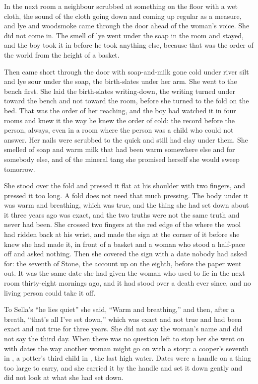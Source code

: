In the next room a neighbour scrubbed at something on the floor with a wet cloth, the sound of the cloth going down and coming up regular as a measure, and lye and woodsmoke came through the door ahead of the woman's voice. She did not come in. The smell of lye went under the soap in the room and stayed, and the boy took it in before he took anything else, because that was the order of the world from the height of a basket.

Then  came short through the door with soap-and-milk gone cold under river silt and lye sour under the soap, the birth-slates under her arm. She went to the bench first. She laid the birth-slates writing-down, the writing turned under toward the bench and not toward the room, before she turned to the fold on the bed. That was the order of her reaching, and the boy had watched it in four rooms and knew it the way he knew the order of cold: the record before the person, always, even in a room where the person was a child who could not answer. Her nails were scrubbed to the quick and still had clay under them. She smelled of soap and warm milk that had been warm somewhere else and for somebody else, and of the mineral tang she promised herself she would sweep tomorrow.

She stood over the fold and pressed it flat at his shoulder with two fingers, and pressed it too long. A fold does not need that much pressing. The body under it was warm and breathing, which was true, and the thing she had set down about it three years ago was exact, and the two truths were not the same truth and never had been. She crossed two fingers at the red edge of the  where the wool had ridden back at his wrist, and made the sign at the corner of it before she knew she had made it, in front of a basket and a woman who stood a half-pace off and asked nothing. Then she covered the sign with a date nobody had asked for: the seventh of Stone, the account up on the eighth, before the paper went out. It was the same date she had given the woman who used to lie in the next room thirty-eight mornings ago, and it had stood over a death ever since, and no living person could take it off.

To Sella's “he lies quiet” she said, “Warm and breathing,” and then, after a breath, “that's all I've set down,” which was exact and not true and had been exact and not true for three years. She did not say the woman's name and did not say the third day. When there was no question left to stop her she went on with dates the way another woman might go on with a story: a cooper's seventh in , a potter's third child in , the last high water. Dates were a handle on a thing too large to carry, and she carried it by the handle and set it down gently and did not look at what she had set down.

